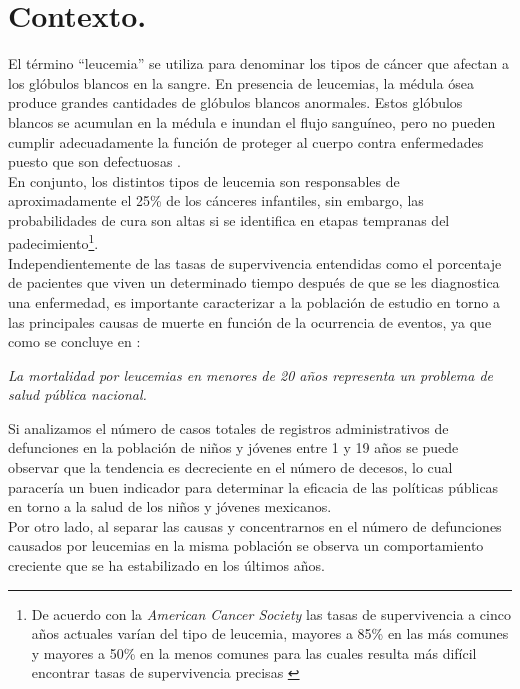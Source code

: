 \documentclass[11pt, oneside]{book}
\begin{document}
\section{Contexto.}
El término “leucemia” se utiliza para denominar los tipos de cáncer que afectan a los glóbulos blancos en la sangre. En presencia de leucemias, la médula ósea produce grandes cantidades de glóbulos blancos anormales. Estos glóbulos blancos se acumulan en la médula e inundan el flujo sanguíneo, pero no pueden cumplir adecuadamente la función de proteger al cuerpo contra enfermedades puesto que son defectuosas \cite{cancer}.\\

En conjunto, los distintos tipos de leucemia son responsables de aproximadamente el 25\% de los cánceres infantiles, sin embargo, las probabilidades de cura son altas si se identifica en etapas tempranas del padecimiento\footnote{De acuerdo con la \emph{American Cancer Society} las tasas de supervivencia a cinco años actuales varían del tipo de leucemia, mayores a 85\% en las más comunes y mayores a 50\% en la menos comunes para las cuales resulta más difícil encontrar tasas de supervivencia precisas \cite{cancer}}.\\

Independientemente de las tasas de supervivencia entendidas como el porcentaje de pacientes que viven un determinado tiempo después de que se les diagnostica una enfermedad, es importante caracterizar a la población de estudio en torno a las principales causas de muerte en función de la ocurrencia de eventos, ya que como se concluye en \cite{rizo}: 

\begin{center}
\emph{La  mortalidad  por  leucemias  en  menores  de  20  años  representa  un  problema  de  salud pública nacional.}\\ 
\end{center}

Si analizamos el número de casos totales de registros administrativos de defunciones en la población de niños y jóvenes entre 1 y 19 años se puede observar que la tendencia es decreciente en el número de decesos, lo cual paracería un buen indicador para determinar la eficacia de las políticas públicas en torno a la salud de los niños y jóvenes mexicanos.\\

Por otro lado, al separar las causas y concentrarnos en el número de defunciones causados por leucemias en la misma población  se observa un comportamiento creciente que se ha estabilizado en los últimos años.\\ 
\end{document}
